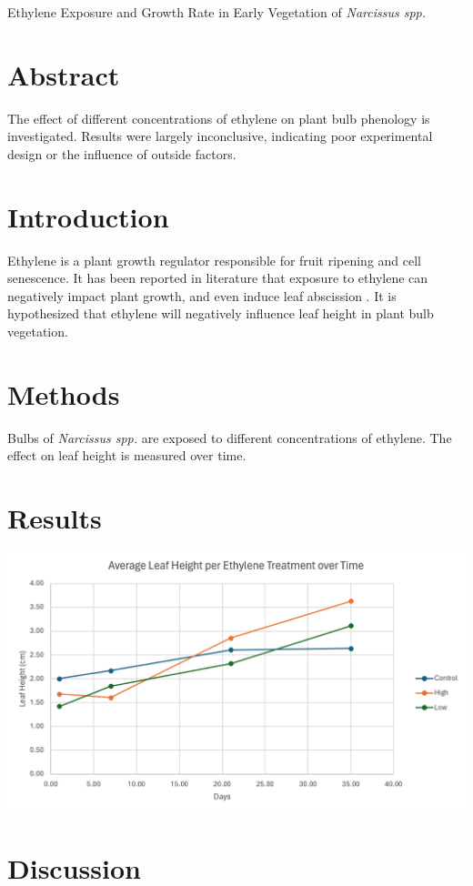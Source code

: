 \documentclass{report}
\newenvironment{Figure}
  {\par\medskip\noindent\minipage{\linewidth}}
  {\endminipage\par\medskip}
\begin{document}
\begin{center}
  \Large
  Ethylene Exposure and Growth Rate in Early Vegetation of \textit{Narcissus spp.}
\end{center}

\vspace{0.5cm}

\begin{multicols}{3}

  \section*{Abstract}
  The effect of different concentrations of ethylene on plant bulb phenology is investigated.
  Results were largely inconclusive, indicating poor experimental design or the influence of outside factors.
  \section*{Introduction}
  Ethylene is a plant growth regulator responsible for fruit ripening and cell senescence.
  It has been reported in literature that exposure to ethylene can negatively impact plant growth, and even induce leaf abscission \parencite{abscission}.
  It is hypothesized that ethylene will negatively influence leaf height in plant bulb vegetation.
  \section*{Methods}
  Bulbs of \textit{Narcissus spp.} are exposed to different concentrations of ethylene.
  The effect on leaf height is measured over time.
  \section*{Results}
  \begin{Figure}
    \centering
    \includegraphics[width=\linewidth]{graph.png}
  \end{Figure}
  \section*{Discussion}
  \lipsum[10]
  
\end{multicols}

\clearpage

\printbibliography
\end{document}
